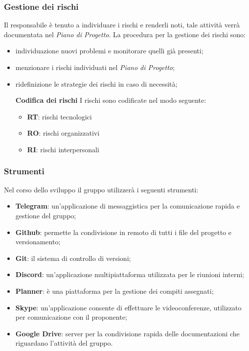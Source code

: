 \subsubsection{Gestione dei rischi}
Il responsabile è tenuto a individuare i rischi e renderli noti, tale attività verrà documentata nel \textit{Piano di Progetto}. La procedura per la gestione dei rischi sono: 
\begin{itemize}
\item individuazione nuovi problemi e monitorare quelli già presenti;
\item menzionare i rischi individuati nel \textit{Piano di Progetto}; 
\item ridefinizione le strategie dei rischi in caso di necessità; \newline \newline

\textbf{Codifica dei rischi} \newline \newline
I rischi sono codificate nel modo seguente: 
\begin{itemize}
\item  \textbf{RT}: rischi tecnologici 
\item \textbf{RO}: rischi organizzativi
\item   \textbf{RI}: rischi interpersonali
\end{itemize}
\end{itemize}
\subsubsection{Strumenti}
Nel corso dello sviluppo il gruppo utilizzerà i seguenti strumenti: 
\begin{itemize}
\item \textbf{Telegram\glo}: un'applicazione di messaggistica per la comunicazione rapida e gestione del gruppo; 
\item \textbf{Github\glo}: permette la condivisione in remoto di tutti i file del progetto e versionamento;
\item \textbf{Git\glo}: il sistema di controllo di versioni;
\item \textbf{Discord}: un'applicazione multipiattaforma utilizzata per le riunioni interni;
\item \textbf{Planner}: è una piattaforma per la gestione dei compiti assegnati;
\item \textbf{Skype}: un'applicazione consente di effettuare le videoconferenze, utilizzato per comunicazione con il proponente;
\item \textbf{Google Drive}: server per la condivisione rapida delle documentazioni che riguardano l'attività del gruppo.
\end{itemize}